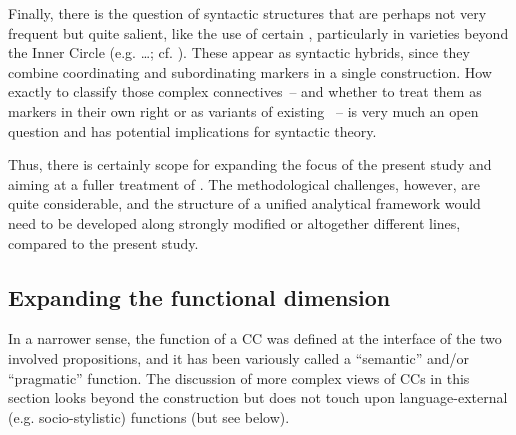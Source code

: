 Finally, there is the question of syntactic structures that are perhaps not very frequent but quite salient, like the use of certain , particularly in varieties beyond the Inner Circle (e.g. …; cf. ). These appear as syntactic hybrids, since they combine coordinating and subordinating markers in a single construction. How exactly to classify those complex connectives~– and whether to treat them as markers in their own right or as variants of existing ~– is very much an open question and has potential implications for syntactic theory.

Thus, there is certainly scope for expanding the focus of the present study and aiming at a fuller treatment of . The methodological challenges, however, are quite considerable, and the structure of a unified analytical framework would need to be developed along strongly modified or altogether different lines, compared to the present study.

\subsection{\label{bkm:Ref82931998}Expanding the functional dimension}\label{sec:12.2.2}

In a narrower sense, the function of a CC was defined at the interface of the two involved propositions, and it has been variously called a “semantic” and/or “pragmatic” function. The discussion of more complex views of CCs in this section looks beyond the construction but does not touch upon language-external (e.g. socio-stylistic) functions (but see  below).

